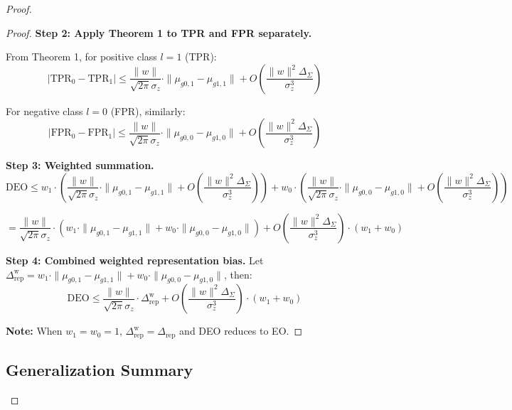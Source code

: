 \documentclass[11pt]{article}
\begin{document}
\begin{proof}
\begin{proof}
\textbf{Step 2: Apply Theorem 1 to TPR and FPR separately.}

From Theorem 1, for positive class $l=1$ (TPR):
$$|\mathrm{TPR}_0 - \mathrm{TPR}_1| \leq \frac{\|w\|}{\sqrt{2\pi}\sigma_z} \cdot \|\mu_{g0,1} - \mu_{g1,1}\| + O\left(\frac{\|w\|^2 \Delta_{\Sigma}}{\sigma_z^3}\right)$$

For negative class $l=0$ (FPR), similarly:
$$|\mathrm{FPR}_0 - \mathrm{FPR}_1| \leq \frac{\|w\|}{\sqrt{2\pi}\sigma_z} \cdot \|\mu_{g0,0} - \mu_{g1,0}\| + O\left(\frac{\|w\|^2 \Delta_{\Sigma}}{\sigma_z^3}\right)$$

\textbf{Step 3: Weighted summation.}
$$\mathrm{DEO} \leq w_1 \cdot \left(\frac{\|w\|}{\sqrt{2\pi}\sigma_z} \cdot \|\mu_{g0,1} - \mu_{g1,1}\| + O\left(\frac{\|w\|^2 \Delta_{\Sigma}}{\sigma_z^3}\right)\right) + w_0 \cdot \left(\frac{\|w\|}{\sqrt{2\pi}\sigma_z} \cdot \|\mu_{g0,0} - \mu_{g1,0}\| + O\left(\frac{\|w\|^2 \Delta_{\Sigma}}{\sigma_z^3}\right)\right)$$

$$= \frac{\|w\|}{\sqrt{2\pi}\sigma_z} \cdot \left(w_1 \cdot \|\mu_{g0,1} - \mu_{g1,1}\| + w_0 \cdot \|\mu_{g0,0} - \mu_{g1,0}\|\right) + O\left(\frac{\|w\|^2 \Delta_{\Sigma}}{\sigma_z^3}\right) \cdot (w_1 + w_0)$$

\textbf{Step 4: Combined weighted representation bias.}
Let $\Delta_{\mathrm{rep}}^{\mathrm{w}} = w_1 \cdot \|\mu_{g0,1} - \mu_{g1,1}\| + w_0 \cdot \|\mu_{g0,0} - \mu_{g1,0}\|$, then:
$$\mathrm{DEO} \leq \frac{\|w\|}{\sqrt{2\pi}\sigma_z} \cdot \Delta_{\mathrm{rep}}^{\mathrm{w}} + O\left(\frac{\|w\|^2 \Delta_{\Sigma}}{\sigma_z^3}\right) \cdot (w_1 + w_0)$$

\textbf{Note:} When $w_1 = w_0 = 1$, $\Delta_{\mathrm{rep}}^{\mathrm{w}} = \Delta_{\mathrm{rep}}$ and DEO reduces to EO.
\end{proof}

\subsection{Generalization Summary}


\end{proof}
\end{document}

